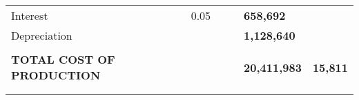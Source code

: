 \begin{table}[H]
\begin{tabular}{llllll}
Interest                                      & 0.05                                   &                                                                    &                             & \textbf{658,692}      &                                          \\
Depreciation                                  &                                        &                                                                    &                             & \textbf{1,128,640}    &                                          \\
                                              &                                        &                                                                    &                             & \textbf{}             &                                          \\ \cline{5-6} 
\textbf{TOTAL COST OF PRODUCTION}             &                                        &                                                                    &                             & \textbf{20,411,983}   & \textbf{15,811}                          \\
\textbf{}                                     &                                        &                                                                    &                             & \textbf{}             & \textbf{}                                \\
                                              &                                        &                                                                    &                             & \textbf{}             & \textbf{}                                \\ \hline
\end{tabular}
\end{table}



